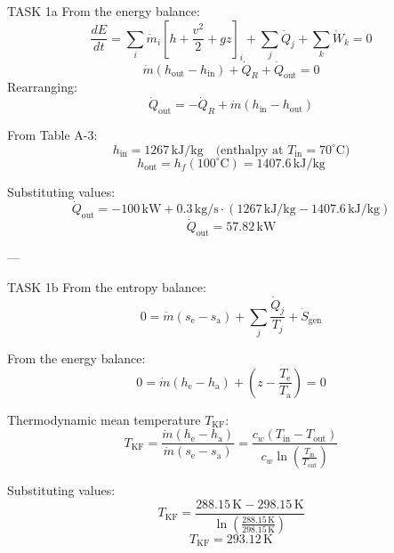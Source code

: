 TASK 1a  
From the energy balance:  
\[
\frac{dE}{dt} = \sum_i \dot{m}_i \left[ h + \frac{v^2}{2} + gz \right]_i + \sum_j \dot{Q}_j + \sum_k \dot{W}_k = 0
\]  
\[
\dot{m} \left( h_{\text{out}} - h_{\text{in}} \right) + \dot{Q}_R + \dot{Q}_{\text{out}} = 0
\]  
Rearranging:  
\[
\dot{Q}_{\text{out}} = -\dot{Q}_R + \dot{m} \left( h_{\text{in}} - h_{\text{out}} \right)
\]  

From Table A-3:  
\[
h_{\text{in}} = 1267 \, \text{kJ/kg} \quad \text{(enthalpy at } T_{\text{in}} = 70^\circ\text{C})
\]  
\[
h_{\text{out}} = h_f(100^\circ\text{C}) = 1407.6 \, \text{kJ/kg}
\]  

Substituting values:  
\[
\dot{Q}_{\text{out}} = -100 \, \text{kW} + 0.3 \, \text{kg/s} \cdot \left( 1267 \, \text{kJ/kg} - 1407.6 \, \text{kJ/kg} \right)
\]  
\[
\dot{Q}_{\text{out}} = 57.82 \, \text{kW}
\]  

---

TASK 1b  
From the entropy balance:  
\[
0 = \dot{m} \left( s_{\text{e}} - s_{\text{a}} \right) + \sum_j \frac{\dot{Q}_j}{T_j} + \dot{S}_{\text{gen}}
\]  

From the energy balance:  
\[
0 = \dot{m} \left( h_{\text{e}} - h_{\text{a}} \right) + \left( z - \frac{T_{\text{e}}}{T_{\text{a}}} \right) = 0
\]  

Thermodynamic mean temperature \( T_{\text{KF}} \):  
\[
T_{\text{KF}} = \frac{\dot{m} \left( h_{\text{e}} - h_{\text{a}} \right)}{\dot{m} \left( s_{\text{e}} - s_{\text{a}} \right)} = \frac{c_w \left( T_{\text{in}} - T_{\text{out}} \right)}{c_w \ln \left( \frac{T_{\text{in}}}{T_{\text{out}}} \right)}
\]  

Substituting values:  
\[
T_{\text{KF}} = \frac{288.15 \, \text{K} - 298.15 \, \text{K}}{\ln \left( \frac{288.15 \, \text{K}}{298.15 \, \text{K}} \right)}
\]  
\[
T_{\text{KF}} = 293.12 \, \text{K}
\]  